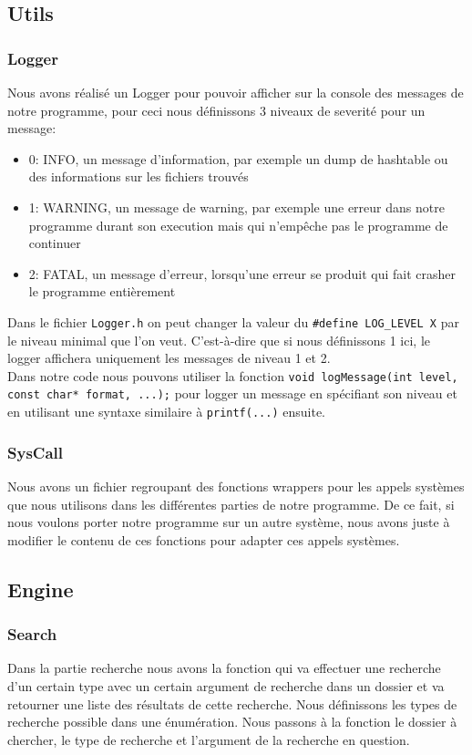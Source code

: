 \documentclass[a4paper]{article}
\begin{document}
\subsection{Utils}
\subsubsection{Logger}
Nous avons réalisé un Logger pour pouvoir afficher sur la console des messages de notre programme, pour ceci nous définissons 3 niveaux de severité pour un message:
\begin{itemize}
	\item 0: INFO, un message d'information, par exemple un dump de hashtable ou des informations sur les fichiers trouvés
	\item 1: WARNING, un message de warning, par exemple une erreur dans notre programme durant son execution mais qui n'empêche pas le programme de continuer
	\item 2: FATAL, un message d'erreur, lorsqu'une erreur se produit qui fait crasher le programme entièrement
\end{itemize}
Dans le fichier \verb+Logger.h+ on peut changer la valeur du \verb+#define LOG_LEVEL X+ par le niveau minimal que l'on veut. C'est-à-dire que si nous définissons 1 ici, le logger affichera uniquement les messages de niveau 1 et 2. \\

Dans notre code nous pouvons utiliser la fonction \verb+void logMessage(int level, const char* format, ...);+ pour logger un message en spécifiant son niveau et en utilisant une syntaxe similaire à \verb+printf(...)+ ensuite.
\subsubsection{SysCall}
Nous avons un fichier regroupant des fonctions wrappers pour les appels systèmes que nous utilisons dans les différentes parties de notre programme. De ce fait, si nous voulons porter notre programme sur un autre système, nous avons juste à modifier le contenu de ces fonctions pour adapter ces appels systèmes.
\subsection{Engine}
\subsubsection{Search}
Dans la partie recherche nous avons la fonction qui va effectuer une recherche d'un certain type avec un certain argument de recherche dans un dossier et va retourner une liste des résultats de cette recherche. Nous définissons les types de recherche possible dans une énumération. Nous passons à la fonction le dossier à chercher, le type de recherche et l'argument de la recherche en question.
\end{document}
